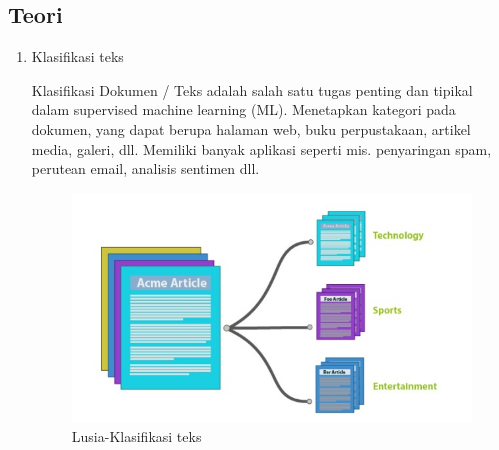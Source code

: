 \subsection{Teori}
\begin{enumerate}
\item Klasifikasi teks
	\par Klasifikasi Dokumen / Teks adalah salah satu tugas penting dan tipikal dalam supervised machine learning (ML). Menetapkan kategori pada dokumen, yang dapat berupa halaman web, buku perpustakaan, artikel media, galeri, dll. Memiliki banyak aplikasi seperti mis. penyaringan spam, perutean email, analisis sentimen dll. 
	\begin{figure}[ht]
		\centering
		\includegraphics[scale=0.5]{figures/m1.jpg}
		\caption{Lusia-Klasifikasi teks}
		\label{contoh}
	\end{figure}
	

\end{enumerate}

